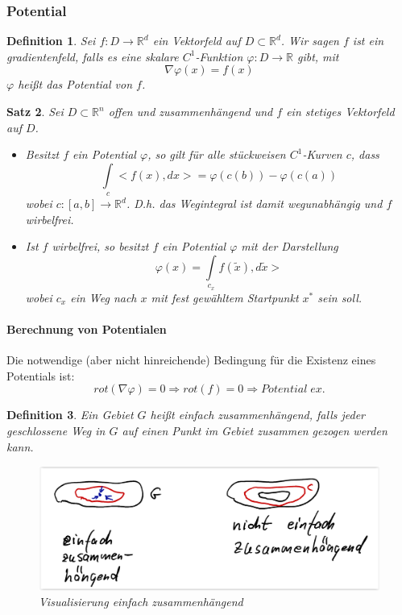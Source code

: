 \documentclass[12pt,a4paper]{report}%
\newtheorem{satz}{Satz}[section]
\newtheorem{definition}[satz]{Definition}
\numberwithin{equation}{section}
\newcommand{\R}{\mathbb{R}} %
\newcommand{\subsubsubsection}{\paragraph}
\numberwithin{equation}{subsection}
\begin{document}
		\subsubsection{Potential}
	  \begin{definition}
	    Sei $f:D\rightarrow \R^d$ ein Vektorfeld auf $D\subset \R^d$. Wir sagen $f$ ist ein gradientenfeld, falls es eine skalare $C^1$-Funktion $\varphi: D\rightarrow\R$ gibt, mit 
	    \begin{equation}
	    \nabla \varphi(x) = f(x)
	    \end{equation}
	    $\varphi$ heißt das Potential von $f$.
	  \end{definition}
    \begin{satz}
      Sei $D \subset \R^n$ offen und zusammenhängend und $f$ ein stetiges Vektorfeld auf $D$. 
      \begin{itemize}
        \item[a) ] Besitzt $f$ ein Potential $\varphi$, so gilt für alle stückweisen $C^1$-Kurven $c$, dass 
        \begin{equation}
          \int\limits_c <f(x),dx> = \varphi(c(b)) - \varphi(c(a))
        \end{equation}
        wobei $c:[a,b]\rightarrow \R^d$. D.h. das Wegintegral ist damit wegunabhängig und $f$ wirbelfrei.
        \item[b) ] Ist $f$ wirbelfrei, so besitzt $f$ ein Potential $\varphi$ mit der Darstellung 
        \begin{equation}
          \varphi(x) = \int\limits_{c_x} f(\tilde{x}),d\tilde{x}>
        \end{equation}
        wobei $c_x$ ein Weg nach $x$ mit fest gewähltem Startpunkt $x^*$ sein soll.
      \end{itemize}
    \end{satz}	  
	  \subsubsubsection{Berechnung von Potentialen}
	  Die notwendige (aber nicht hinreichende) Bedingung für die Existenz eines Potentials ist:
	  \begin{equation}
	    rot(\nabla \varphi) = 0 \Rightarrow rot(f) = 0 \Rightarrow Potential\;ex.  
	  \end{equation}
	  \begin{definition}
	    Ein Gebiet $G$ heißt einfach zusammenhängend, falls jeder geschlossene Weg in $G$ auf einen Punkt im Gebiet zusammen gezogen werden kann.
	    \begin{figure}[H] 
			  \centering
			  \includegraphics[width=0.8\linewidth]{einfach_zusammenhaengend.png}
			  \caption{Visualisierung einfach zusammenhängend \protect\cite{HM12}}
			  \label{fig:einfach_zusammenhängend}
		  \end{figure}
	  \end{definition}
	  
\end{document}
